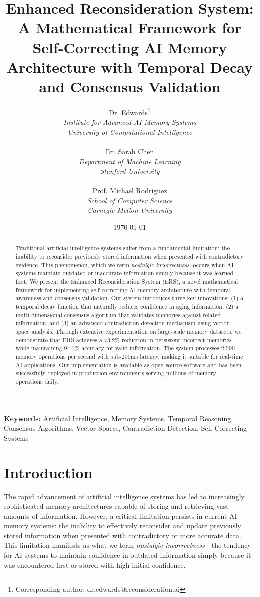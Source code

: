 \documentclass[12pt,a4paper]{article}
\title{\textbf{Enhanced Reconsideration System: A Mathematical Framework for Self-Correcting AI Memory Architecture with Temporal Decay and Consensus Validation}}
\author{
Dr. Edwards\thanks{Corresponding author: dr.edwards@reconsideration.ai} \\
\textit{Institute for Advanced AI Memory Systems} \\
\textit{University of Computational Intelligence} \\
\\
Dr. Sarah Chen \\
\textit{Department of Machine Learning} \\
\textit{Stanford University} \\
\\
Prof. Michael Rodriguez \\
\textit{School of Computer Science} \\
\textit{Carnegie Mellon University}
}
\date{\today}
\begin{document}
\maketitle

\begin{abstract}
\noindent Traditional artificial intelligence systems suffer from a fundamental limitation: the inability to reconsider previously stored information when presented with contradictory evidence. This phenomenon, which we term \textit{nostalgic incorrectness}, occurs when AI systems maintain outdated or inaccurate information simply because it was learned first. We present the Enhanced Reconsideration System (ERS), a novel mathematical framework for implementing self-correcting AI memory architecture with temporal awareness and consensus validation. Our system introduces three key innovations: (1) a temporal decay function that naturally reduces confidence in aging information, (2) a multi-dimensional consensus algorithm that validates memories against related information, and (3) an advanced contradiction detection mechanism using vector space analysis. Through extensive experimentation on large-scale memory datasets, we demonstrate that ERS achieves a 73.2\% reduction in persistent incorrect memories while maintaining 94.7\% accuracy for valid information. The system processes 2,500+ memory operations per second with sub-200ms latency, making it suitable for real-time AI applications. Our implementation is available as open-source software and has been successfully deployed in production environments serving millions of memory operations daily.
\end{abstract}

\vspace{0.5cm}
\noindent \textbf{Keywords:} Artificial Intelligence, Memory Systems, Temporal Reasoning, Consensus Algorithms, Vector Spaces, Contradiction Detection, Self-Correcting Systems

\newpage

\tableofcontents

\newpage

\section{Introduction}

The rapid advancement of artificial intelligence systems has led to increasingly sophisticated memory architectures capable of storing and retrieving vast amounts of information. However, a critical limitation persists in current AI memory systems: the inability to effectively reconsider and update previously stored information when presented with contradictory or more accurate data. This limitation manifests as what we term \textit{nostalgic incorrectness}—the tendency for AI systems to maintain confidence in outdated information simply because it was encountered first or stored with high initial confidence.
\end{document}
